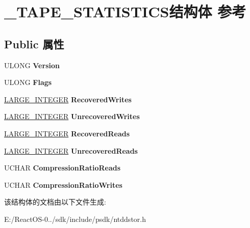 \hypertarget{struct___t_a_p_e___s_t_a_t_i_s_t_i_c_s}{}\section{\+\_\+\+T\+A\+P\+E\+\_\+\+S\+T\+A\+T\+I\+S\+T\+I\+C\+S结构体 参考}
\label{struct___t_a_p_e___s_t_a_t_i_s_t_i_c_s}
\subsection*{Public 属性}
\begin{DoxyCompactItemize}
\item 
\mbox{\label{struct___t_a_p_e___s_t_a_t_i_s_t_i_c_s_ab153a305ac90800e08a3b88e28613888}} 
U\+L\+O\+NG {\bfseries Version}
\item 
\mbox{\label{struct___t_a_p_e___s_t_a_t_i_s_t_i_c_s_aa8e4866d1905f470db5ab76a2ead3ce5}} 
U\+L\+O\+NG {\bfseries Flags}
\item 
\mbox{\label{struct___t_a_p_e___s_t_a_t_i_s_t_i_c_s_a75f6d3cc6c7af362569cd5bbc77cacfb}} 
\hyperlink{union___l_a_r_g_e___i_n_t_e_g_e_r}{L\+A\+R\+G\+E\+\_\+\+I\+N\+T\+E\+G\+ER} {\bfseries Recovered\+Writes}
\item 
\mbox{\label{struct___t_a_p_e___s_t_a_t_i_s_t_i_c_s_afd2df9ac952ad0d66537a709f99c052f}} 
\hyperlink{union___l_a_r_g_e___i_n_t_e_g_e_r}{L\+A\+R\+G\+E\+\_\+\+I\+N\+T\+E\+G\+ER} {\bfseries Unrecovered\+Writes}
\item 
\mbox{\label{struct___t_a_p_e___s_t_a_t_i_s_t_i_c_s_a92dbebab2a7c1c9e8864af5715fb333c}} 
\hyperlink{union___l_a_r_g_e___i_n_t_e_g_e_r}{L\+A\+R\+G\+E\+\_\+\+I\+N\+T\+E\+G\+ER} {\bfseries Recovered\+Reads}
\item 
\mbox{\label{struct___t_a_p_e___s_t_a_t_i_s_t_i_c_s_a2f79788ca15ed969aa334abdf14dffa5}} 
\hyperlink{union___l_a_r_g_e___i_n_t_e_g_e_r}{L\+A\+R\+G\+E\+\_\+\+I\+N\+T\+E\+G\+ER} {\bfseries Unrecovered\+Reads}
\item 
\mbox{\label{struct___t_a_p_e___s_t_a_t_i_s_t_i_c_s_af47528ae87dfabc73a2fb6b28cb819b0}} 
U\+C\+H\+AR {\bfseries Compression\+Ratio\+Reads}
\item 
\mbox{\label{struct___t_a_p_e___s_t_a_t_i_s_t_i_c_s_ab940ddc0fe2b39d6806edb7c9674eac0}} 
U\+C\+H\+AR {\bfseries Compression\+Ratio\+Writes}
\end{DoxyCompactItemize}


该结构体的文档由以下文件生成\+:\begin{DoxyCompactItemize}
\item 
E\+:/\+React\+O\+S-\/0../sdk/include/psdk/ntddstor.\+h\end{DoxyCompactItemize}
